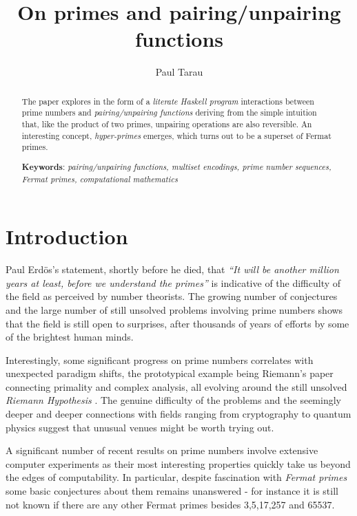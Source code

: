 \documentclass[]{INCLUDES/llncs}
\title{
    On primes and pairing/unpairing functions
 }
\author{Paul Tarau}
\institute{
   Department of Computer Science and Engineering\\
   University of North Texas\\
   {\em E-mail: tarau@cs.unt.edu}
}
\begin{document}
\maketitle
\date{}

\begin{abstract}
The paper explores in the form of a {\em literate Haskell program}
interactions between prime numbers and {\em pairing/unpairing
functions} deriving from the simple intuition that, like the product of two
primes, unpairing operations are also reversible. An interesting concept, {\em
hyper-primes} emerges, which turns out to be a superset of Fermat primes.

{\bf Keywords}:
{\em 
pairing/unpairing functions,
multiset encodings,
prime number sequences,
Fermat primes,
computational mathematics
}
\end{abstract}

\begin{comment}
\begin{code}
module ISOPRIMES where
import Data.List
import Data.Bits
import Ratio
import Random
import ISO0
\end{code}
\end{comment}

\section{Introduction}

Paul Erd\"{o}s's statement, shortly before he died, that {\em ``It will be
another million years at least, before we understand the primes''} is
indicative of the difficulty of the field as perceived by number theorists.
The growing number of conjectures \cite{journals/fuin/CegielskiRV07} and the
large number of still unsolved problems involving prime numbers \cite{CP2005} shows 
that the field is still
open to surprises, after thousands of years of efforts by some of the brightest human
minds.

Interestingly, some significant progress on prime numbers correlates with
unexpected paradigm shifts, the prototypical example being Riemann's paper
\cite{riemannPrimes} connecting primality and complex analysis, all evolving
around the still unsolved {\em Riemann Hypothesis}
\cite{VTW86,conf/stoc/Miller75,chaitinRiemann}. 
The genuine difficulty of the problems and the seemingly deeper and deeper 
connections with fields ranging from cryptography to quantum
physics suggest that unusual venues might be worth trying out. 

A significant number of recent results on prime numbers involve
extensive computer experiments \cite{BBC1999} as their most interesting
properties quickly take us beyond the edges of computability. In particular,
despite fascination with {\em Fermat primes} some basic
conjectures about them remains unanswered - for instance it is still not known
if there are any other Fermat primes besides 3,5,17,257 and 65537.
\end{document}
